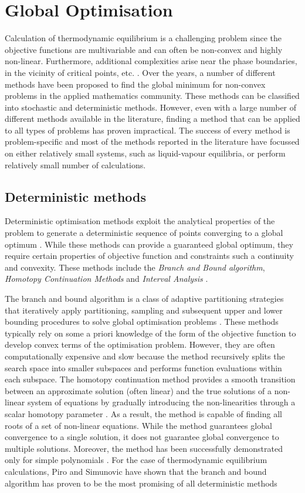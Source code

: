 	\section{Global Optimisation}
	Calculation of thermodynamic equilibrium is a challenging problem since the objective functions are multivariable and can often be non-convex and highly non-linear. Furthermore, additional complexities arise near the phase boundaries, in the vicinity of critical points, etc. \cite{Wakeham04,TEH2002745}. Over the years, a number of different methods have been proposed to find the global minimum for non-convex problems in the applied mathematics community. These methods can be classified into stochastic and deterministic methods. However, even with a large number of different methods available in the literature, finding a method that can be applied to all types of problems has proven impractical. The success of every method is problem-specific and most of the methods reported in the literature have focussed on either relatively small systems, such as liquid-vapour equilibria, or perform relatively small number of calculations.

	\subsection{Deterministic methods}
	Deterministic optimisation methods exploit the analytical properties of the problem to generate a deterministic sequence of points converging to a global optimum \cite{PARDALOS2000209}. While these methods can provide a guaranteed global optimum, they require certain properties of objective function and constraints such a continuity and convexity. These methods include the \emph{Branch and Bound algorithm}, \emph{Homotopy Continuation Methods}  and \emph{Interval Analysis} \cite{Floudas99}.

	The branch and bound algorithm is a class of adaptive partitioning strategies that iteratively apply partitioning, sampling and subsequent upper and lower bounding procedures to solve global optimisation problems \cite{Floudas99}.  These methods typically rely on some a priori knowledge of the form of the objective function to  develop convex terms of the optimisation problem. However, they are often computationally expensive and slow \cite{Wakeham04,Nichita02} because the method recursively splits the search space into smaller subspaces and performs function evaluations within each subspace. The homotopy continuation method provides a smooth transition between an approximate solution (often linear) and the true solutions of a non-linear system of equations by gradually introducing the non-linearities through a scalar homotopy parameter \cite{B.-Riggs:1994aa,JALALI20082333}. As a result, the method is capable of finding all roots of a set of non-linear equations. While the method guarantees global convergence to a single solution, it does not guarantee global convergence to multiple solutions. Moreover, the method has been successfully demonstrated only for simple polynomials \cite{Zhang11}.
For the case of thermodynamic equilibrium calculations, Piro and Simunovic \cite{Piro16} have shown that the branch and bound algorithm has proven to be the most promising of all deterministic methods

